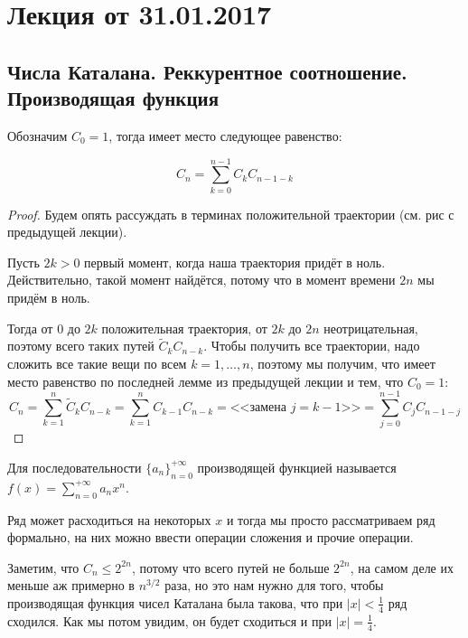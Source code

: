\section{Лекция от 31.01.2017}

\subsection{Числа Каталана. Реккурентное соотношение. Производящая функция}
\begin{lemma}
  Обозначим $C_0 = 1$, тогда имеет место следующее равенство:

  \[
    C_n = \sum\limits_{k = 0}^{n - 1} C_k C_{n - 1 - k}
  \]
\end{lemma}

\begin{proof}
  Будем опять рассуждать в терминах положительной траектории (см. рис с предыдущей
  лекции).

  Пусть $2k > 0$ первый момент, когда наша траектория придёт в ноль. Действительно,
  такой момент найдётся, потому что в момент времени $2n$ мы придём в ноль.

  Тогда от $0$ до $2k$ положительная траектория, от $2k$ до $2n$ неотрицательная,
  поэтому всего таких путей $\tilde{C}_{k}C_{n - k}$. Чтобы получить все траектории,
  надо сложить все такие вещи по всем $k = 1, \ldots, n$, поэтому мы получим,
  что имеет место равенство по последней лемме из предыдущей лекции и тем, что $C_0 = 1$:
  \[
    C_n = \sum\limits_{k = 1}^n \tilde{C}_{k}C_{n - k} =
    \sum\limits_{k = 1}^n C_{k - 1}C_{n - k} = \text{<<замена $j = k - 1$>>} =
    \sum\limits_{j = 0}^{n - 1} C_j C_{n - 1 - j}
  \]
\end{proof}

\begin{definition}
  Для последовательности $\{a_n\}_{n = 0}^{+\infty}$ производящей функцией называется $f(x) = \sum\limits_{n = 0}^{+\infty} a_n x^n$.
\end{definition}

Ряд может расходиться на некоторых $x$ и тогда мы просто
рассматриваем ряд формально, на них можно ввести операции сложения
и прочие операции.

Заметим, что $C_n \leq 2^{2n}$, 
потому что всего путей не больше $2^{2n}$, на самом деле их меньше
аж примерно в $n^{3/2}$ раза, но это нам нужно для того, чтобы 
производящая функция чисел Каталана была такова, что при 
$|x| < \frac{1}{4}$ ряд сходился. Как мы потом увидим, он будет 
сходиться и при $|x| = \frac{1}{4}$.

